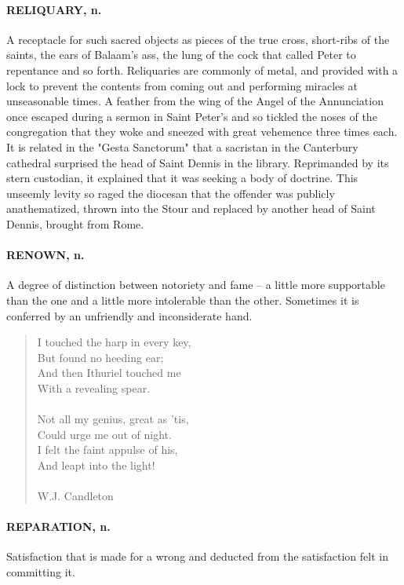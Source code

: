 \documentclass[11pt]{article}
\begin{document}
\paragraph{RELIQUARY, n.}  A receptacle for such sacred objects as pieces of the
true cross, short-ribs of the saints, the ears of Balaam's ass, the
lung of the cock that called Peter to repentance and so forth.
Reliquaries are commonly of metal, and provided with a lock to prevent
the contents from coming out and performing miracles at unseasonable
times.  A feather from the wing of the Angel of the Annunciation once
escaped during a sermon in Saint Peter's and so tickled the noses of
the congregation that they woke and sneezed with great vehemence three
times each.  It is related in the "Gesta Sanctorum" that a sacristan
in the Canterbury cathedral surprised the head of Saint Dennis in the
library.  Reprimanded by its stern custodian, it explained that it was
seeking a body of doctrine.  This unseemly levity so raged the
diocesan that the offender was publicly anathematized, thrown into the
Stour and replaced by another head of Saint Dennis, brought from Rome.

\paragraph{RENOWN, n.}  A degree of distinction between notoriety and fame -- a
little more supportable than the one and a little more intolerable
than the other.  Sometimes it is conferred by an unfriendly and
inconsiderate hand.

\begin{quote}   I touched the harp in every key, \\
      But found no heeding ear; \\
  And then Ithuriel touched me \\
      With a revealing spear. \\
 \\
  Not all my genius, great as 'tis, \\
      Could urge me out of night. \\
  I felt the faint appulse of his, \\
      And leapt into the light! \\
 \\
W.J. Candleton \end{quote}


\paragraph{REPARATION, n.}  Satisfaction that is made for a wrong and deducted
from the satisfaction felt in committing it.
\end{document}

